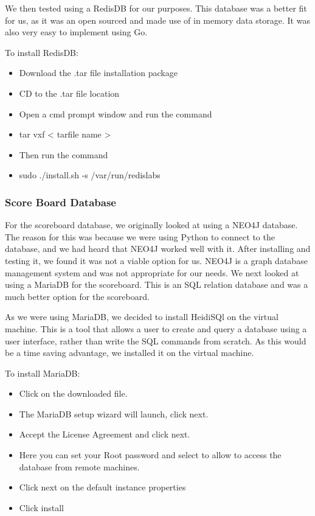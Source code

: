 We then tested using a RedisDB for our purposes. This database was a better fit for us, as it was an open sourced and made use of in memory data storage. It was also very easy to implement using Go.
\newline

To install RedisDB:
\begin{itemize}
\item Download the .tar file installation package
\item CD to the .tar file location 
\item Open a cmd prompt window and run the command
\item  tar vxf < tarfile name >
\item Then run the command 
\item sudo ./install.sh -s /var/run/redislabs
\end{itemize}
\newline
\subsubsection{Score Board Database}
For the scoreboard database, we originally looked at using a NEO4J database.
The reason for this was because we were using Python to connect to the database, and we had heard that NEO4J worked well with it. After installing and testing it, we found it was not a viable option for us. NEO4J is a graph database management system and was not appropriate for our needs.
We next looked at using a MariaDB for the scoreboard. This is an SQL relation database and was a much better option for the scoreboard.
\newline

As we were using MariaDB, we decided to install HeidiSQl on the virtual machine. This is a tool that allows a user to create and query a database using a user interface, rather than write the SQL commands from scratch. As this would be a time saving advantage, we installed it on the virtual machine.
\newline

To install MariaDB:
\begin{itemize}
\item Click on the downloaded file.
\item The MariaDB setup wizard will launch, click next.
\item Accept the License Agreement and click next.
\item Here you can set your Root password and select to allow to access the database from remote machines.
\item Click next on the default instance properties 
\item Click install 
\end{itemize}
\newline

